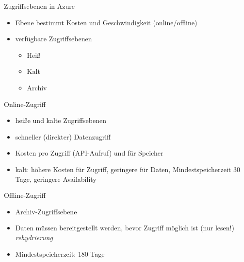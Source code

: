 

\begin{flashcard}[Definition]{Zugriffsebenen in Azure}
  \begin{itemize}
    \item Ebene bestimmt Kosten und Geschwindigkeit (online/offline)
    \item verfügbare Zugriffsebenen
      \begin{itemize}
        \item Heiß
        \item Kalt
        \item Archiv
      \end{itemize}
  \end{itemize}
\end{flashcard}

\begin{flashcard}[Definition]{Online-Zugriff}
  \begin{itemize}
    \item heiße und kalte Zugriffsebenen
    \item schneller (direkter) Datenzugriff
    \item Kosten pro Zugriff (API-Aufruf) und für Speicher
    \item kalt: höhere Kosten für Zugriff, geringere für Daten, Mindestspeicherzeit 30 Tage, geringere Availability
  \end{itemize}
\end{flashcard}
 
\begin{flashcard}[Definition]{Offline-Zugriff}
  \begin{itemize}
    \item Archiv-Zugriffsebene
    \item Daten müssen bereitgestellt werden, bevor Zugriff möglich ist (nur lesen!)\newline
      \emph{rehydrierung}
    \item Mindestspeicherzeit: 180 Tage
  \end{itemize}
\end{flashcard}
 
